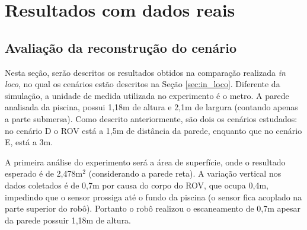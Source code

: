 \section{Resultados com dados reais}

\subsection{Avaliação da reconstrução do cenário}
\label{sec:avaliacao_cenarios_inloco}

Nesta seção, serão descritos os resultados obtidos na comparação realizada \textit{in loco}, no qual os cenários estão descritos na Seção \ref{sec:in_loco}.
Diferente da simulação, a unidade de medida utilizada no experimento é o metro.
A parede analisada da piscina, possui 1,18m de altura e 2,1m de largura (contando apenas a parte submersa).
Como descrito anteriormente, são dois os cenários estudados: no cenário D o ROV está a 1,5m de distância da parede, enquanto que no cenário E, está a 3m.

A primeira análise do experimento será a área de superfície, onde o resultado esperado é de 2,478m$^2$ (considerando a parede reta).
A variação vertical nos dados coletados é de 0,7m por causa do corpo do ROV, que ocupa 0,4m, impedindo que o sensor prossiga até o fundo da piscina (o sensor fica acoplado na parte superior do robô).
Portanto o robô realizou o escaneamento de 0,7m apesar da parede possuir 1,18m de altura. 

